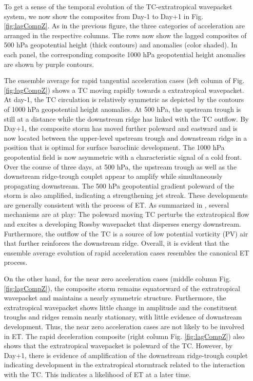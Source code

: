 \documentclass[wcd,manuscript]{copernicus}
\begin{document}
% 
To get a sense of the temporal evolution of the TC-extratropical wavepacket system, we now show the composites from Day-1 to Day+1 in Fig. \ref{fig:lagCompZ}. As in the previous figure, the three categories of acceleration are arranged in the respective columns. The rows now show the lagged composites of 500 hPa geopotential height (thick contours) and anomalies (color shaded). In each panel, the corresponding composite 1000 hPa geopotential height anomalies are shown by purple contours. 

The ensemble average for rapid tangential acceleration cases (left column of Fig. \ref{fig:lagCompZ}) shows a TC moving rapidly towards a extratropical wavepacket. At day-1, the TC circulation is relatively symmetric as depicted by the contours of 1000 hPa geopotential height anomalies. At 500 hPa, the upstream trough is still at a distance while the downstream ridge has linked with the TC outflow. By Day+1, the composite storm has moved further poleward and eastward and is now located between the upper-level upstream trough and downstream ridge in a position that is optimal for surface baroclinic development. The 1000 hPa geopotential field is now asymmetric with a characteristic signal of a cold front.  Over the course of three days, at 500 hPa, the upstream trough as well as the downstream ridge-trough couplet appear to amplify while simultaneously propagating downstream. The 500 hPa geopotential gradient poleward of the storm is also amplified, indicating a strengthening jet streak. These developments are generally consistent with the process of ET. As summarized in \citet{K2019}, several mechanisms are at play: The poleward moving TC perturbs the extratropical flow and excites a developing Rossby wavepacket that disperses energy downstream. Furthermore, the outflow of the TC is a source of low potential vorticity (PV) air that further reinforces the downstream ridge. Overall, it is evident that the ensemble average evolution of rapid acceleration cases resembles the canonical ET process.

On the other hand, for the near zero acceleration cases (middle column Fig. \ref{fig:lagCompZ}), the composite storm remains equatorward of the extratropical wavepacket and maintains a nearly symmetric structure. Furthermore, the extratropical wavepacket shows little change in amplitude and the constituent troughs and ridges remain nearly stationary, with little evidence of downstream development.  Thus, the near zero acceleration cases are not likely to be involved in ET. The rapid deceleration composite (right column Fig. \ref{fig:lagCompZ}) also shows that the extratropical wavepacket is poleward of the TC. However, by Day+1, there is evidence of amplification of the downstream ridge-trough couplet indicating development in the extratropical stormtrack related to the interaction with the TC.  This indicates a likelihood of ET at a later time.
\end{document}
